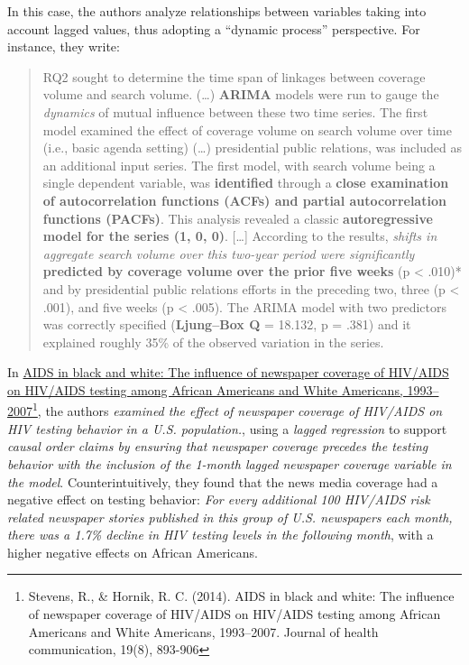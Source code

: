 \documentclass[
]{article}
\begin{document}
In this case, the authors analyze relationships between variables taking into account lagged values, thus adopting a ``dynamic process'' perspective. For instance, they write:

\begin{quote}
RQ2 sought to determine the time span of linkages between coverage volume and search volume. (\ldots) \textbf{ARIMA} models were run to gauge the \emph{dynamics} of mutual influence between these two time series. The first model examined the effect of coverage volume on search volume over time (i.e., basic agenda setting) (\ldots) presidential public relations, was included as an additional input series. The first model, with search volume being a single dependent variable, was \textbf{identified} through a \textbf{close examination of autocorrelation functions (ACFs) and partial autocorrelation functions (PACFs)}. This analysis revealed a classic \textbf{autoregressive model for the series (1, 0, 0)}. {[}\ldots{]} According to the results, \emph{shifts in aggregate search volume over this two-year period were significantly} \textbf{predicted by coverage volume over the prior five weeks} (p \textless{} .010)* and by presidential public relations efforts in the preceding two, three (p \textless{} .001), and five weeks (p \textless{} .005). The ARIMA model with two predictors was correctly specified (\textbf{Ljung--Box Q} = 18.132, p = .381) and it explained roughly 35\% of the observed variation in the series.
\end{quote}

In \href{https://www.ncbi.nlm.nih.gov/pmc/articles/PMC4126885/}{AIDS in black and white: The influence of newspaper coverage of HIV/AIDS on HIV/AIDS testing among African Americans and White Americans, 1993--2007}\footnote{Stevens, R., \& Hornik, R. C. (2014). AIDS in black and white: The influence of newspaper coverage of HIV/AIDS on HIV/AIDS testing among African Americans and White Americans, 1993--2007. Journal of health communication, 19(8), 893-906}, the authors \emph{examined the effect of newspaper coverage of HIV/AIDS on HIV testing behavior in a U.S. population.}, using a \emph{lagged regression} to support \emph{causal order claims by ensuring that newspaper coverage precedes the testing behavior with the inclusion of the 1-month lagged newspaper coverage variable in the model}. Counterintuitively, they found that the news media coverage had a negative effect on testing behavior: \emph{For every additional 100 HIV/AIDS risk related newspaper stories published in this group of U.S. newspapers each month, there was a 1.7\% decline in HIV testing levels in the following month}, with a higher negative effects on African Americans.
\end{document}
